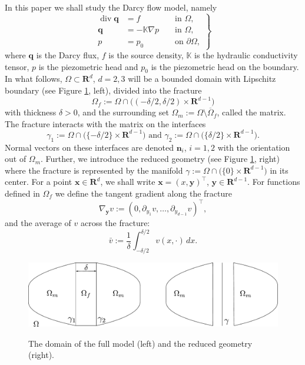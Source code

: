 \documentclass{llncs}
\def\vc#1{\mathbf{\boldsymbol{#1}}}     %
\def\tn#1{{\mathbb{#1}}}    %
\def\div{\operatorname{div}}
\def\grad{\nabla}
\def\Real{{\mathbf R}}
\def\yy{{\vc y}}
\begin{document}
In this paper we shall study the Darcy flow model, namely
\begin{equation}
\label{eq:darcy_flow}
\left.
\begin{aligned}
    \div \vc q &= f &&\mbox{ in }\Omega, \\
    \vc q &= -\tn K \grad p &&\mbox{ in }\Omega,\\
    p &= p_0 &&\mbox{ on }\partial\Omega,
\end{aligned}
\right\}
\end{equation}
where $\vc q$ is the Darcy flux, $f$ is the source density, $\tn K$ is the hydraulic conductivity tensor, $p$ is the piezometric head and $p_0$ is 
the piezometric head on the boundary.
In what follows, $\Omega \subset \Real^d$, $d=2,3$ will be a bounded domain with Lipschitz boundary (see Figure \ref{fig:omegas}, left), divided into the fracture
\[ \Omega_f:=\Omega\cap \big((-\delta/2,\delta/2)\times\Real^{d-1}\big) \]
with thickness $\delta>0$, and the surrounding set $\Omega_m:=\Omega\setminus\overline\Omega_f$, called the matrix.
The fracture interacts with the matrix on the interfaces 
\[ \gamma_1:=\Omega\cap\big( \{-\delta/2\}\times \Real^{d-1}\big) \mbox{ and }\gamma_2:=\Omega\cap\big( \{ \delta/2\}\times \Real^{d-1}\big). \]
Normal vectors on these interfaces are denoted $\vc n_i$, $i=1,2$ with the orientation out of $\Omega_m$.
Further, we introduce the reduced geometry (see Figure \ref{fig:omegas}, right)
where the fracture is represented by the manifold $\gamma:=\Omega\cap\big(\{0\}\times\Real^{d-1}\big)$ in its center.
For a  point $\vc x\in\Real^d$, we shall write $\vc x=(x,\yy)^\top$, $\yy\in\Real^{d-1}$.
For functions defined in $\Omega_f$ we define the tangent gradient along the fracture
\[ \nabla_\yy v:=(0,\partial_{y_1} v,\ldots,\partial_{y_{d-1}} v)^\top, \]
and the average of $v$ across the fracture:
\[ \bar v:=\frac1\delta\int_{-\delta/2}^{\delta/2} v(x,\cdot)\,dx. \]
\begin{figure}[h]
\centering
\includegraphics[width=12cm]{figures/full_model_domain}
\label{fig:omegas}
\caption{The domain of the full model (left) and the reduced geometry (right).}
\end{figure}
\end{document}
